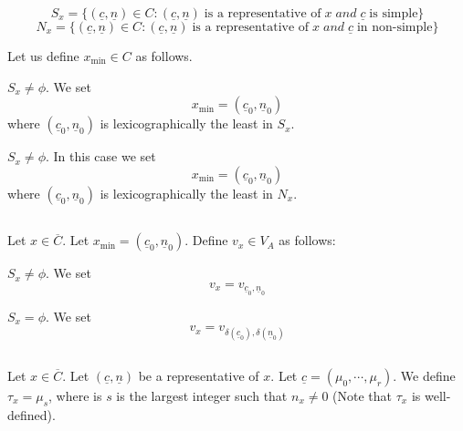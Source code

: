 $$
S_{x}=\{(\underline{c}, \underline{n}) \in C: (\underline{c}, \underline{n})\; \text{is a representative of}\; x \; and \; \underline{c}\; \text{is simple}\}
$$
$$
N_{x}=\{(\underline{c}, \underline{n}) \in C : (\underline{c},\underline{n})\; \text{is a representative of}\; x \; and \;\underline{c} \; \text{in non-simple}\}
$$

Let us define $x_{\min} \in C$ as follows.

\setcounter{case}{0}
\begin{case}\label{chap9-subsec3.12-case-1}
$S_{x} \neq \phi$. We set
$$
x_{\min}= (\underline{c}_{0}, \underline{n}_{0})
$$
where $(\underline{c}_{0}, \underline{n}_{0})$ is lexicographically the least in $S_{x}$.
\end{case}

\begin{case}\label{chap9-subsec3.12-case-2}
$S_{x}\neq \phi$. In this case we set
$$
x_{\min} = (\underline{c}_{0}, \underline{n}_{0})
$$
where $(\underline{c}_{0}, \underline{n}_{0})$ is lexicographically the least in $N_{x}$.
\end{case}

\subsection{}\label{chap9-subsec-3.13}
Let $x \in \overline{C}$. Let $x_{\min}= (\underline{c}_{0}, \underline{n}_{0})$. Define $v_{x} \in V_{A}$ as follows:

\setcounter{case}{0}
\begin{case}\label{chap9-subsec3.13-case-1}
$S_{x}\neq \phi$. We set
$$
v_{x}=v_{\underline{c}_{0}, \underline{n}_{0}}
$$
\end{case}
\begin{case}\label{chap9-subsec3.13-case-2}
$S_{x}=\phi$. We set
$$
v_{x}=v_{\delta(\underline{c}_{0}), \delta(\underline{n}_{0})}
$$
\end{case}

\subsection{}\label{chap9-subsec-3.14}
 Let $x\in \overline{C}$. Let $(\underline{c}, \underline{n})$ be a representative of $x$. Let $\underline{c} = (\mu_{0}, \cdots, \mu_{r})$. We define $\tau_{x} = \mu_{s}$, where is $s$ is the largest integer such that $n_{x} \neq 0$ (Note that $\tau_{x}$ is well-defined).

